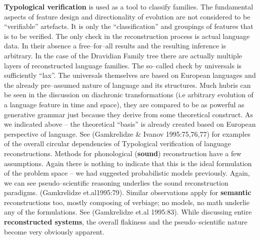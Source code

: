 \textbf{Typological verification} is used as a tool to classify families. The fundamental aspects of feature design and directionality of evolution are not considered to be “verifiable” artefacts. It is only the “classification” and groupings of features that is to be verified. The only check in the reconstruction process is actual language data. In their absence a free–for–all results and the resulting inference is arbitrary. In the case of the Dravidian Family tree there are actually multiple layers of reconstructed language families. The so–called check by universals is sufficiently “lax”. The universals themselves are based on European languages and the already pre–assumed nature of language and its structures. Much hubris can be seen in the discussion on diachronic transformations (i.e arbitrary evolution of a language feature in time and space), they are compared to be as powerful as generative grammar just because they derive from some theoretical construct. As we indicated above – the theoretical “basis” is already created based on European perspective of language. See (Gamkrelidze \& Ivanov 1995:75,76,77) for examples of the overall circular dependencies of Typological verification of language reconstructions. Methods for phonological (\textbf{sound}) reconstruction have a few assumptions. Again there is nothing to indicate that this is the ideal formulation of the problem space – we had suggested probabilistic models previously. Again, we can see pseudo–scientific reasoning underlies the sound reconstruction paradigms. (Gamkrelidze et.al1995:79). Similar observations apply for \textbf{semantic} reconstructions too, mostly composing of verbiage; no models, no math underlie any of the formulations. See (Gamkrelidze et.al 1995:83). While discussing entire \textbf{reconstructed systems}, the overall flakiness and the pseudo–scientific nature become very obviously apparent.

